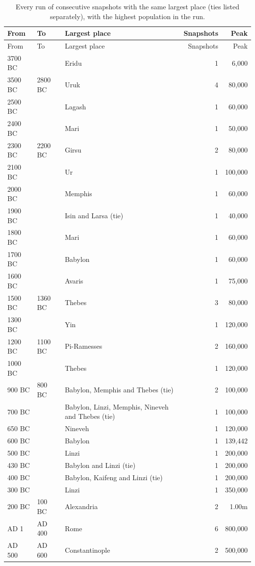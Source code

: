 \documentclass[11pt,a4paper]{article}
\begin{document}
\begin{longtable}{llp{6.6cm}rr}\caption{Every run of consecutive snapshots with the same largest place (ties listed separately), with the highest population in the run.}\label{tab:reigns}\\\toprule From & To & Largest place & Snapshots & Peak\\\midrule\endfirsthead\toprule From & To & Largest place & Snapshots & Peak\\\midrule\endhead
3700 BC &  & Eridu & 1 & 6,000\\
3500 BC & 2800 BC & Uruk & 4 & 80,000\\
2500 BC &  & Lagash & 1 & 60,000\\
2400 BC &  & Mari & 1 & 50,000\\
2300 BC & 2200 BC & Girsu & 2 & 80,000\\
2100 BC &  & Ur & 1 & 100,000\\
2000 BC &  & Memphis & 1 & 60,000\\
1900 BC &  & Isin and Larsa (tie) & 1 & 40,000\\
1800 BC &  & Mari & 1 & 60,000\\
1700 BC &  & Babylon & 1 & 60,000\\
1600 BC &  & Avaris & 1 & 75,000\\
1500 BC & 1360 BC & Thebes & 3 & 80,000\\
1300 BC &  & Yin & 1 & 120,000\\
1200 BC & 1100 BC & Pi-Ramesses & 2 & 160,000\\
1000 BC &  & Thebes & 1 & 120,000\\
900 BC & 800 BC & Babylon, Memphis and Thebes (tie) & 2 & 100,000\\
700 BC &  & Babylon, Linzi, Memphis, Nineveh and Thebes (tie) & 1 & 100,000\\
650 BC &  & Nineveh & 1 & 120,000\\
600 BC &  & Babylon & 1 & 139,442\\
500 BC &  & Linzi & 1 & 200,000\\
430 BC &  & Babylon and Linzi (tie) & 1 & 200,000\\
400 BC &  & Babylon, Kaifeng and Linzi (tie) & 1 & 200,000\\
300 BC &  & Linzi & 1 & 350,000\\
200 BC & 100 BC & Alexandria & 2 & 1.00m\\
AD 1 & AD 400 & Rome & 6 & 800,000\\
AD 500 & AD 600 & Constantinople & 2 & 500,000\\

\end{longtable}
\end{document}
